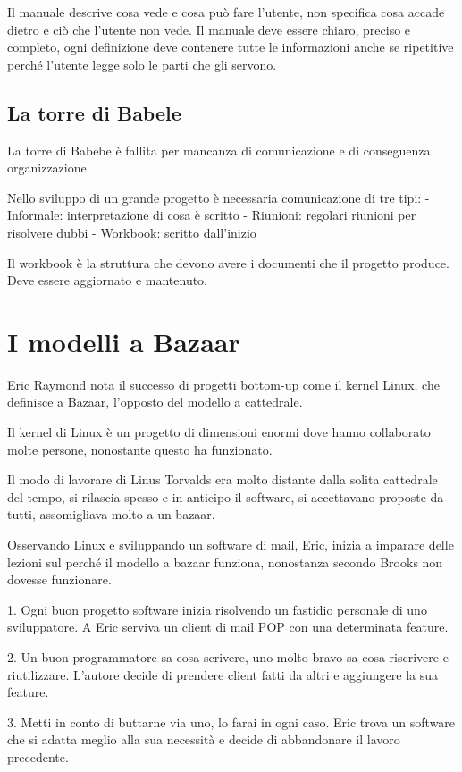 \documentclass[a4paper,12pt,titlepage,oneside]{book}
\begin{document}
Il manuale descrive cosa vede e cosa può fare l'utente, non specifica cosa accade dietro e ciò che l'utente non vede. Il manuale deve essere chiaro, preciso e completo, ogni definizione deve contenere tutte le informazioni anche se ripetitive perché l'utente legge solo le parti che gli servono.

\subsection{La torre di Babele}
La torre di Babebe è fallita per mancanza di comunicazione e di conseguenza organizzazione.

Nello sviluppo di un grande progetto è necessaria comunicazione di tre tipi:
- Informale: interpretazione di cosa è scritto
- Riunioni: regolari riunioni per risolvere dubbi
- Workbook: scritto dall'inizio

Il workbook è la struttura che devono avere i documenti che il progetto produce. Deve essere aggiornato e mantenuto.

\section{I modelli a Bazaar}
Eric Raymond nota il successo di progetti bottom-up come il kernel Linux, che definisce a Bazaar, l'opposto del modello a cattedrale.

Il kernel di Linux è un progetto di dimensioni enormi dove hanno collaborato molte persone, nonostante questo ha funzionato.

Il modo di lavorare di Linus Torvalds era molto distante dalla solita cattedrale del tempo, si rilascia spesso e in anticipo il software, si accettavano proposte da tutti, assomigliava molto a un bazaar.

Osservando Linux e sviluppando un software di mail, Eric, inizia a imparare delle lezioni sul perché il modello a bazaar funziona, nonostanza secondo Brooks non dovesse funzionare.

1. Ogni buon progetto software inizia risolvendo un fastidio personale di uno sviluppatore.
A Eric serviva un client di mail POP con una determinata feature.

2. Un buon programmatore sa cosa scrivere, uno molto bravo sa cosa riscrivere e riutilizzare.
L'autore decide di prendere client fatti da altri e aggiungere la sua feature.

3. Metti in conto di buttarne via uno, lo farai in ogni caso.
Eric trova un software che si adatta meglio alla sua necessità e decide di abbandonare il lavoro precedente.
\end{document}
